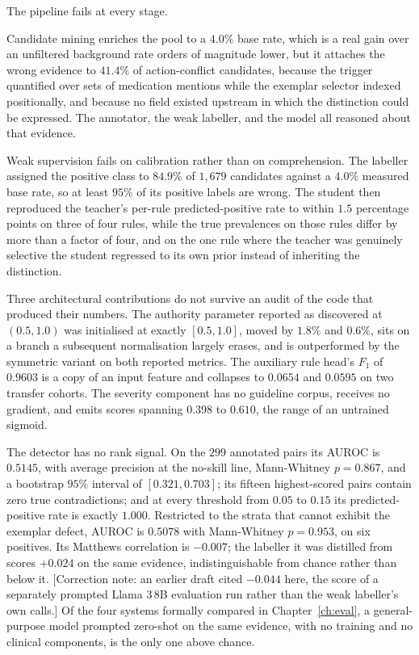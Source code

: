 The pipeline fails at every stage.

Candidate mining enriches the pool to a $4.0\%$ base rate, which is a real gain
over an unfiltered background rate orders of magnitude lower, but it attaches
the wrong evidence to $41.4\%$ of action-conflict candidates, because the trigger
quantified over sets of medication mentions while the exemplar selector indexed
positionally, and because no field existed upstream in which the distinction
could be expressed. The annotator, the weak labeller, and the model all reasoned
about that evidence.

Weak supervision fails on calibration rather than on comprehension. The labeller
assigned the positive class to $84.9\%$ of $1{,}679$ candidates against a $4.0\%$
measured base rate, so at least $95\%$ of its positive labels are wrong. The
student then reproduced the teacher's per-rule predicted-positive rate to within
$1.5$ percentage points on three of four rules, while the true prevalences on
those rules differ by more than a factor of four, and on the one rule where the
teacher was genuinely selective the student regressed to its own prior instead
of inheriting the distinction.

Three architectural contributions do not survive an audit of the code that
produced their numbers. The authority parameter reported as discovered at
$(0.5, 1.0)$ was initialised at exactly $[0.5, 1.0]$, moved by $1.8\%$ and
$0.6\%$, sits on a branch a subsequent normalisation largely erases, and is
outperformed by the symmetric variant on both reported metrics. The auxiliary
rule head's $F_1$ of $0.9603$ is a copy of an input feature and collapses to
$0.0654$ and $0.0595$ on two transfer cohorts. The severity component has no
guideline corpus, receives no gradient, and emits scores spanning $0.398$ to
$0.610$, the range of an untrained sigmoid.

The detector has no rank signal. On the $299$ annotated pairs its AUROC is
$0.5145$, with average precision at the no-skill line, Mann-Whitney $p = 0.867$,
and a bootstrap $95\%$ interval of $[0.321, 0.703]$; its fifteen highest-scored
pairs contain zero true contradictions; and at every threshold from $0.05$ to
$0.15$ its predicted-positive rate is exactly $1.000$. Restricted to the strata
that cannot exhibit the exemplar defect, AUROC is $0.5078$ with Mann-Whitney
$p = 0.953$, on six positives. Its Matthews correlation is $-0.007$; the
labeller it was distilled from scores $+0.024$ on the same evidence,
indistinguishable from chance rather than below it. [Correction note: an
earlier draft cited $-0.044$ here, the score of a separately prompted Llama
3\,8B evaluation run rather than the weak labeller's own calls.] Of the four
systems formally compared in Chapter~\ref{ch:eval}, a general-purpose model
prompted zero-shot on the same evidence, with no training and no clinical
components, is the only one above chance.

